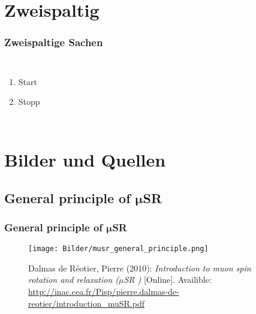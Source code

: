 \documentclass[8pt]{beamer}
\newcommand{\musr}{$\mu$SR }
\begin{document}
\section{Zweispaltig}
\begin{frame}
	\frametitle{Zweispaltige Sachen}
    \begin{columns}
                 \begin{enumerate}
                 \item Start
                 \item Stopp
                 \end{enumerate}
    \end{columns}
\end{frame}






\section{Bilder und Quellen}
\subsection{General principle of $\mathbf{\mu}$SR}
\begin{frame}[fragile]
	\frametitle{General principle of $\mathbf{\mu}$SR}
	\begin{figure}[!htb]
		\begin{center}
			\texttt{[image: Bilder/musr\_general\_principle.png]}%
			\caption*{  \setlength{\baselineskip}{6pt}
				{\tiny Dalmas de Réotier, Pierre (2010): \textit{Introduction to muon spin rotation and relaxation (\musr)} [Online]. Availible: \url{http://inac.cea.fr/Pisp/pierre.dalmas-de-				reotier/introduction_muSR.pdf}}
			}%
		\end{center}
	\end{figure}          
\end{frame}
\end{document}
